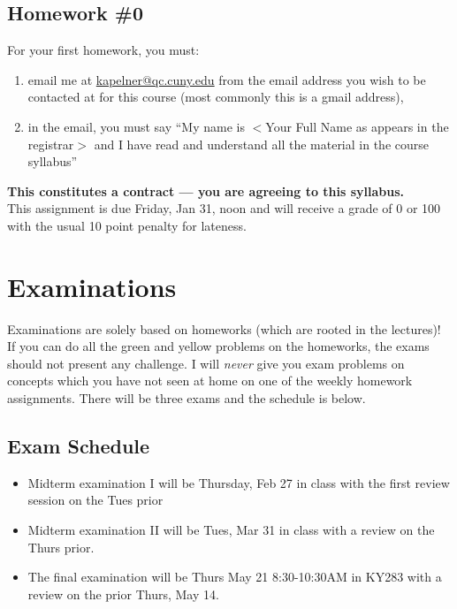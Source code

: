 \documentclass[12pt]{article}
\newcommand{\inred}[1]{\color{red}\textbf{#1} \color{black}}
\newcommand{\qu}[1]{``#1''}
\begin{document}
\subsection*{Homework \#0}

For your first homework, you must:

\begin{enumerate}[(1)]
\item email me at \href{kapelner@qc.cuny.edu}{kapelner@qc.cuny.edu} from the email address you wish to be contacted at for this course (most commonly this is a gmail address),
\item in the email, you must say \qu{My name is $<$Your Full Name as appears in the registrar$>$ and I have read and understand all the material in the course syllabus}
\end{enumerate}

\noindent \inred{This constitutes a contract --- you are agreeing to this syllabus.} \\

This assignment is due Friday, Jan 31, noon and will receive a grade of 0 or 100 with the usual 10 point penalty for lateness.


\section*{Examinations}

Examinations are solely based on homeworks (which are rooted in the lectures)! If you can do all the green and yellow problems on the homeworks, the exams should not present any challenge. I will \textit{never} give you exam problems on concepts which you have not seen at home on one of the weekly homework assignments. There will be three exams and the schedule is below.

\subsection*{Exam Schedule}\label{subsec:exam_schedule}

\begin{itemize}
\itemsep -0.0em 
\item Midterm examination I will be Thursday, Feb 27 in class with the first review session on the Tues prior
\item Midterm examination II will be Tues, Mar 31 in class with a review on the Thurs prior.
\item The final examination will be Thurs May 21 8:30-10:30AM in KY283 with a review on the prior Thurs, May 14.
\end{itemize}
\end{document}
